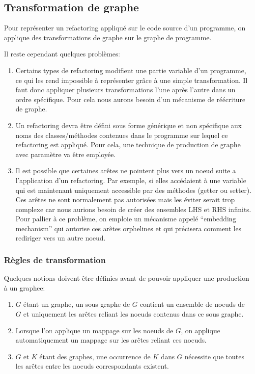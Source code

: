 \documentclass[a4paper, 12pt]{article}
\begin{document}
  \subsection{Transformation de graphe}

  Pour représenter un refactoring appliqué sur le code source d'un programme, on applique des transformations de graphe sur le graphe de programme.

  Il reste cependant quelques problèmes:

  \begin{enumerate}
    \item Certains types de refactoring modifient une partie variable d'un programme, ce qui les rend impossible à représenter grâce à une simple transformation.
    Il faut donc appliquer plusieurs transformations l'une après l'autre dans un ordre spécifique. Pour cela nous aurons besoin d'un mécanisme de réécriture de graphe.

    \item Un refactoring devra être défini sous forme générique et non spécifique aux noms des classes/méthodes contenues dans le programme sur lequel ce refactoring est appliqué.
    Pour cela, une technique de production de graphe avec paramètre va être employée.

    \item Il est possible que certaines arêtes ne pointent plus vers un noeud suite a l'application d'un refactoring.
    Par exemple, si elles accédaient à une variable qui est maintenant uniquement accessible par des méthodes (getter ou setter).
    Ces arêtes ne sont normalement pas autorisées mais les éviter serait trop complexe car nous aurions besoin de créer des ensembles LHS et RHS infinits.
    Pour pallier à ce problème, on emploie un mécanisme appelé ``embedding mechanism'' qui autorise ces arêtes orphelines et qui précisera comment les rediriger vers un autre noeud.
  \end{enumerate}

  \subsubsection{Règles de transformation}

  Quelques notions doivent être définies avant de pouvoir appliquer une production à un graphee:

  \begin{enumerate}
    \item \(G\) étant un graphe, un sous graphe de \(G\) contient un ensemble de noeuds de \(G\) et uniquement les arêtes reliant les noeuds contenus dans ce sous graphe.

    \item Lorsque l'on applique un mappage sur les noeuds de \(G\), on applique automatiquement un mappage sur les arêtes reliant ces noeuds.

    \item \(G\) et \(K\) étant des graphes, une occurrence de \(K\) dans \(G\) nécessite que toutes les arêtes entre les noeuds correspondants existent.

  \end{enumerate}
\end{document}
